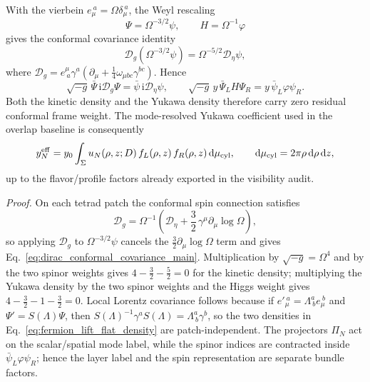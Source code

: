 \documentclass[aps,prd,onecolumn,notitlepage,nofootinbib,superscriptaddress,11pt,floatfix]{revtex4-2}
\newcommand{\dd}{\mathrm{d}}
\newcommand{\ii}{\mathrm{i}}
\begin{document}
With the vierbein \(e_\mu^{\ a}=\Omega\delta_\mu^{\ a}\), the Weyl rescaling
\[
\Psi=\Omega^{-3/2}\psi,\qquad H=\Omega^{-1}\varphi
\]
gives the conformal covariance identity
\begin{equation}
\mathcal D_g(\Omega^{-3/2}\psi)=\Omega^{-5/2}\mathcal D_\eta\psi,
\label{eq:dirac_conformal_covariance_main}
\end{equation}
where \(\mathcal D_g=e^\mu_{\ a}\gamma^a(\partial_\mu+\frac14\omega_{\mu bc}\gamma^{bc})\).  Hence
\begin{equation}
\sqrt{-g}\,\bar\Psi\,\ii\mathcal D_g\Psi
=\bar\psi\,\ii\mathcal D_\eta\psi,
\qquad
\sqrt{-g}\,y\,\bar\Psi_L H\Psi_R
=y\,\bar\psi_L\varphi\psi_R.
\label{eq:fermion_lift_flat_density}
\end{equation}
Both the kinetic density and the Yukawa density therefore carry zero residual conformal frame weight.  The mode-resolved Yukawa coefficient used in the overlap baseline is consequently
\begin{equation}
y_N^{\rm eff}
=y_0\int_\Sigma u_N(\rho,z;D)\,f_L(\rho,z)\,f_R(\rho,z)\,\dd\mu_{\rm cyl},
\qquad
\dd\mu_{\rm cyl}=2\pi\rho\,\dd\rho\,\dd z,
\label{eq:fermion_lift_yN}
\end{equation}
up to the flavor/profile factors already exported in the visibility audit.

\emph{Proof.}
On each tetrad patch the conformal spin connection satisfies
\[
\mathcal D_g
=\Omega^{-1}\left(\mathcal D_\eta+\frac32\,\gamma^\mu\partial_\mu\log\Omega\right),
\]
so applying \(\mathcal D_g\) to \(\Omega^{-3/2}\psi\) cancels the \(\frac32\partial_\mu\log\Omega\) term and gives Eq.~\eqref{eq:dirac_conformal_covariance_main}.  Multiplication by \(\sqrt{-g}=\Omega^4\) and by the two spinor weights gives \(4-\frac32-\frac52=0\) for the kinetic density; multiplying the Yukawa density by the two spinor weights and the Higgs weight gives \(4-\frac32-1-\frac32=0\).  Local Lorentz covariance follows because if \(e'{}_\mu^{\ a}=\Lambda^a_{\ b}e_\mu^{\ b}\) and \(\Psi'=S(\Lambda)\Psi\), then \(S(\Lambda)^{-1}\gamma^aS(\Lambda)=\Lambda^a_{\ b}\gamma^b\), so the two densities in Eq.~\eqref{eq:fermion_lift_flat_density} are patch-independent.  The projectors \(\Pi_N\) act on the scalar/spatial mode label, while the spinor indices are contracted inside \(\bar\psi_L\varphi\psi_R\); hence the layer label and the spin representation are separate bundle factors.
\end{document}
